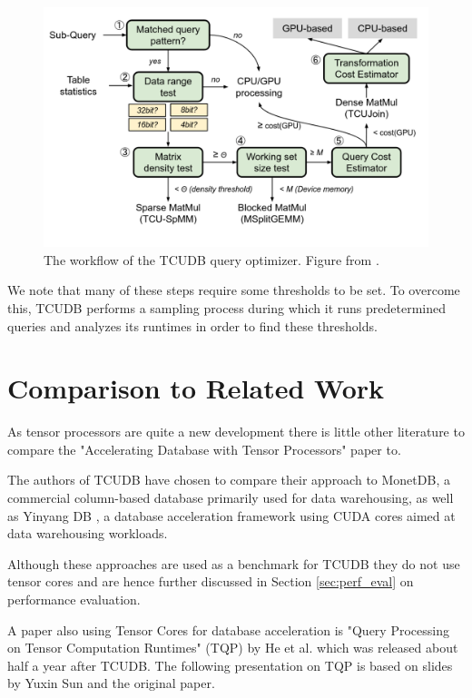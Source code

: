 \documentclass{paper}
\begin{document}
	\begin{figure}
		\centering
		\includegraphics[width=0.9\linewidth]{pipeline}
		\caption{The workflow of the TCUDB query optimizer. Figure from \cite{hu2021tcudb}.} 
		\label{fig:pipeline}
	\end{figure}
	
	We note that many of these steps require some thresholds to be set. To overcome this, TCUDB performs a sampling process during which it runs predetermined queries and analyzes its runtimes in order to find these thresholds.
	
	\section{Comparison to Related Work} \label{sec:rel_work}
	As tensor processors are quite a new development there is little other literature to compare the "Accelerating Database with Tensor Processors" paper to. 
	
	The authors of TCUDB have chosen to compare their approach to MonetDB, a commercial column-based database primarily used for data warehousing, as well as  Yinyang DB \cite{yuan2013yin}, a database acceleration framework using CUDA cores aimed at data warehousing workloads. 
	
	Although these approaches are used as a benchmark for TCUDB they do not use tensor cores and are hence further discussed in Section \ref{sec:perf_eval} on performance evaluation.
	
	A paper also using Tensor Cores for database acceleration is "Query Processing on Tensor Computation Runtimes" (TQP) \cite{he2022query} by He et al. which was released about half a year after TCUDB. The following presentation on TQP is based on slides by Yuxin Sun \cite{sun_2022} and the original paper.
	
\end{document}
